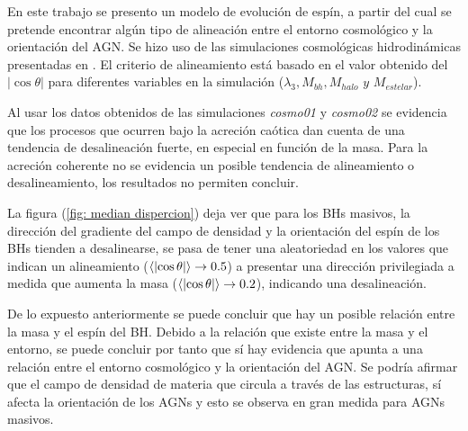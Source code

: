 
En este trabajo se presento un modelo de evolución de espín, a partir del cual se pretende encontrar algún tipo de alineación entre el entorno cosmológico y la orientación del AGN. Se hizo uso de las simulaciones cosmológicas hidrodinámicas presentadas en \cite{Bustamante2018b}. El criterio de alineamiento está basado en el valor obtenido del $|\cos \theta|$ para diferentes variables en la simulación ($\lambda_{3}, M_{bh}, M_{halo} \,\, y \,\, M_{estelar}$). 

Al usar los datos obtenidos de las simulaciones {\it{cosmo01}} y {\it{cosmo02}} se evidencia que los procesos que ocurren bajo la acreción caótica dan cuenta de una tendencia de desalineación fuerte, en especial en función de la masa. Para la acreción coherente no se evidencia un posible tendencia de alineamiento o desalineamiento, los resultados no permiten concluir. 

La figura (\ref{fig: median dispercion}) deja ver que para los BHs masivos, la dirección del gradiente del campo de densidad y la orientación del espín de los BHs tienden a desalinearse, se pasa de tener una aleatoriedad en los valores que indican un alineamiento ($\expval{\abs{\cos \theta}}\to 0.5$) a presentar una dirección  privilegiada a medida que aumenta la masa ($\expval{\abs{\cos \theta}}\to 0.2$), indicando una desalineación. %

De lo expuesto anteriormente se puede concluir que hay un posible relación entre la masa y el espín del BH. Debido a la relación que existe entre la masa y el entorno, se puede concluir por tanto que sí hay evidencia que apunta a una relación entre el entorno cosmológico y la orientación del AGN. Se podría afirmar que el campo de densidad de materia que circula a través de las estructuras, sí afecta la orientación de los AGNs y esto se observa en gran medida para AGNs masivos.





